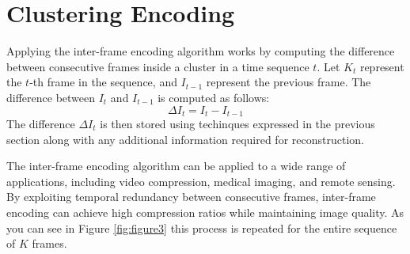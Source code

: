 \documentclass[twocolumn]{article}
\begin{document}
\section{Clustering Encoding}
Applying the inter-frame encoding algorithm works by computing the difference between consecutive frames inside a cluster in a time sequence $t$. Let $K_{t}$ represent the $t$-th frame in the sequence, and $I_{t-1}$ represent the previous frame. The difference between $I_{t}$ and $I_{t-1}$ is computed as follows:
\[
\Delta I_{t} = I_{t} - I_{t-1}
\]
The difference $\Delta I_{t}$ is then stored using techinques expressed in the previous section along with any additional information required for reconstruction.

The inter-frame encoding algorithm can be applied to a wide range of applications, including video compression, medical imaging, and remote sensing. By exploiting temporal redundancy between consecutive frames, inter-frame encoding can achieve high compression ratios while maintaining image quality. As you can see in Figure \ref{fig:figure3} this process is repeated for the entire sequence of $K$ frames.
\end{document}
